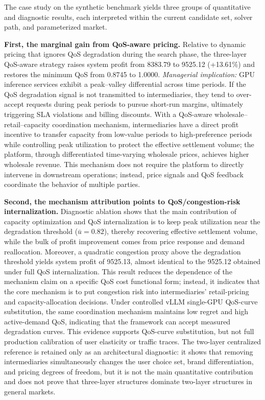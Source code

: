 \documentclass[11pt,a4paper]{article}
\begin{document}
The case study on the synthetic benchmark yields three groups of quantitative and diagnostic results, each interpreted within the current candidate set, solver path, and parameterized market.

\textbf{First, the marginal gain from QoS-aware pricing.} Relative to dynamic pricing that ignores QoS degradation during the search phase, the three-layer QoS-aware strategy raises system profit from 8383.79 to 9525.12 (+13.61\%) and restores the minimum QoS from 0.8745 to 1.0000. \textit{Managerial implication:} GPU inference services exhibit a peak--valley differential across time periods. If the QoS degradation signal is not transmitted to intermediaries, they tend to over-accept requests during peak periods to pursue short-run margins, ultimately triggering SLA violations and billing discounts. With a QoS-aware wholesale--retail--capacity coordination mechanism, intermediaries have a direct profit incentive to transfer capacity from low-value periods to high-preference periods while controlling peak utilization to protect the effective settlement volume; the platform, through differentiated time-varying wholesale prices, achieves higher wholesale revenue. This mechanism does not require the platform to directly intervene in downstream operations; instead, price signals and QoS feedback coordinate the behavior of multiple parties.

\textbf{Second, the mechanism attribution points to QoS/congestion-risk internalization.} Diagnostic ablation shows that the main contribution of capacity optimization and QoS internalization is to keep peak utilization near the degradation threshold ($\bar u=0.82$), thereby recovering effective settlement volume, while the bulk of profit improvement comes from price response and demand reallocation. Moreover, a quadratic congestion proxy above the degradation threshold yields system profit of 9525.13, almost identical to the 9525.12 obtained under full QoS internalization. This result reduces the dependence of the mechanism claim on a specific QoS cost functional form; instead, it indicates that the core mechanism is to put congestion risk into intermediaries' retail-pricing and capacity-allocation decisions. Under controlled vLLM single-GPU QoS-curve substitution, the same coordination mechanism maintains low regret and high active-demand QoS, indicating that the framework can accept measured degradation curves. This evidence supports QoS-curve substitution, but not full production calibration of user elasticity or traffic traces. The two-layer centralized reference is retained only as an architectural diagnostic: it shows that removing intermediaries simultaneously changes the user choice set, brand differentiation, and pricing degrees of freedom, but it is not the main quantitative contribution and does not prove that three-layer structures dominate two-layer structures in general markets.
\end{document}
